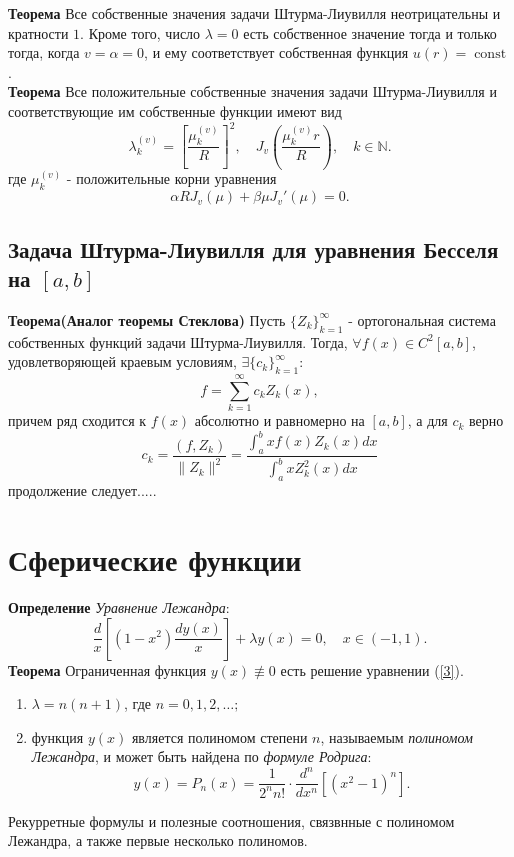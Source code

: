 \documentclass{article}
\begin{document}
\noindent\textbf{Теорема} Все собственные значения задачи Штурма-Лиувилля неотрицательны и кратности $1$. Кроме того, число $\lambda =0$ есть собственное значение тогда и только тогда, когда $v=\alpha=0$, и ему соответствует собственная функция $u(r)=\operatorname{const}$.\\

\noindent\textbf{Теорема} Все положительные собственные значения задачи Штурма-Лиувилля и соответствующие им собственные функции имеют вид
\begin{equation}
\lambda_k^{(v)}=\left[\frac{\mu_k^{(v)}}{R}\right]^2,\quad J_v\left(\frac{\mu_k^{(v)}r}{R}\right),\quad k\in \mathbb{N}.
\end{equation}
где $\mu_k^{(v)}$ - положительные корни уравнения
\begin{equation}
\alpha RJ_v(\mu)+\beta\mu J_v'(\mu)=0.
\end{equation}
\subsection{Задача Штурма-Лиувилля для уравнения Бесселя на $[a,b]$}
\textbf{Теорема(Аналог теоремы Стеклова)} Пусть $\{Z_k\}_{k=1}^{\infty}$ - ортогональная система собственных функций задачи Штурма-Лиувилля. Тогда, $\forall f(x)\in C^2[a,b]$, удовлетворяющей краевым условиям, $\exists\{c_k\}_{k=1}^{\infty}$:
\begin{equation}
f=\sum_{k=1}^{\infty} c_kZ_k(x),
\end{equation}
причем ряд сходится к $f(x)$ абсолютно и равномерно на $[a,b]$, а для $c_k$ верно
\begin{equation}
c_k=\frac{(f,Z_k)}{\|Z_k\|^2}=\frac{\int_{a}^{b}xf(x)Z_k(x)dx}{\int_{a}^{b}xZ_k^2(x)dx}
\end{equation}
продолжение следует.....
\section{Сферические функции}
\textbf{Определение} \emph{Уравнение Лежандра}:
\begin{equation}
\frac{d}{x}\left[(1-x^2)\frac{dy(x)}{x}\right]+\lambda y(x)=0,\quad x\in(-1,1).
\label{3}
\end{equation}
\textbf{Теорема} Ограниченная функция $y(x)\not\equiv0$ есть решение уравнении (\ref{3}).
\begin{enumerate}
	\item $\lambda = n(n+1) $, где $n=0,1,2,\ldots;$
	\item функция $y(x)$ является полиномом степени $n$, называемым \emph{полиномом Лежандра}, и может быть найдена по \emph{формуле Родрига}:
	\begin{equation}
	y(x)=P_n(x)=\frac{1}{2^nn!}\cdot \frac{d^n}{dx^n}\left[\left(x^2-1\right)^n\right].
	\end{equation} 
\end{enumerate}
Рекурретные формулы и полезные соотношения, связвнные с полиномом Лежандра, а также первые несколько полиномов.\\
\end{document}
